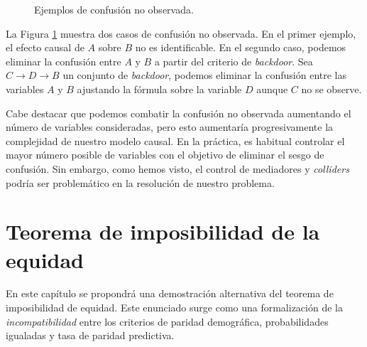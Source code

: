 \documentclass[oneside,openright,titlepage,numbers=noenddot,openany,headinclude,footinclude=true,
cleardoublepage=empty,abstractoff,BCOR=5mm,paper=a4,fontsize=12pt,main=spanish]{scrreprt}
\begin{document}
\begin{figure}[h]
\centering
{}
\caption{Ejemplos de confusión no observada.}
\label{fig:unobserved}
\end{figure}

La Figura \ref{fig:unobserved} muestra dos casos de confusión no observada. En el primer ejemplo, el efecto causal de $A$ sobre $B$ no es identificable. En el segundo caso, podemos eliminar la confusión entre $A$ y $B$ a partir del criterio de \textit{backdoor}. Sea $C \to D \to B$ un conjunto de \textit{backdoor}, podemos eliminar la confusión entre las variables $A$ y $B$ ajustando la fórmula sobre la variable $D$ aunque $C$ no se observe.

Cabe destacar que podemos combatir la confusión no observada aumentando el número de variables consideradas, pero esto aumentaría progresivamente la complejidad de nuestro modelo causal. En la práctica, es habitual controlar el mayor número posible de variables con el objetivo de eliminar el sesgo de confusión. Sin embargo, como hemos visto, el control de mediadores y \textit{colliders} podría ser problemático en la resolución de nuestro problema.

\chapter{Teorema de imposibilidad de la equidad} \label{ch:teoremaimposibilidad}

En este capítulo se propondrá una demostración alternativa del teorema de imposibilidad de equidad. Este enunciado surge como una formalización de la \textit{incompatibilidad} entre los criterios de paridad demográfica, probabilidades igualadas y tasa de paridad predictiva.
\end{document}
